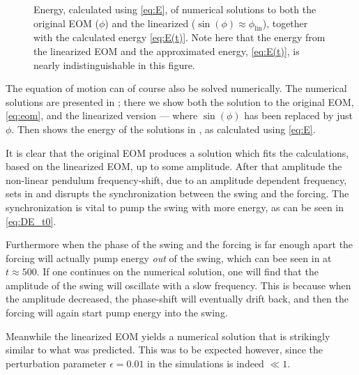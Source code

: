 \begin{figure}\centering
\caption{Energy, calculated using \eqref{eq:E}, of numerical solutions
  to both the original EOM ($\phi$) and the linearized
  ($\sin(\phi)\approx\phi_\text{lin}$), together with the calculated energy
  \eqref{eq:E(t)}. Note here that the energy from the linearized EOM
  and the approximated energy, \eqref{eq:E(t)}, is nearly
  indistinguishable in this figure.
}
\label{fig:sim_E}
\end{figure}

The equation of motion can of course also be solved numerically. The
numerical solutions are presented in ; there we show
both the solution to the original EOM, \eqref{eq:eom}, and the
linearized version --- where $\sin(\phi)$ has been replaced by just
$\phi$. Then  shows the energy of the solutions in
, as calculated using \eqref{eq:E}.

It is clear that the original EOM produces a solution which fits the
calculations, based on the linearized EOM, up to some amplitude. After
that amplitude the non-linear pendulum frequency-shift, due to an
amplitude dependent frequency, sets in and disrupts the
synchronization between the swing and the forcing. The synchronization is vital
to pump the swing with more energy, as can be seen in
\eqref{eq:DE_t0}. 

Furthermore when the phase of the swing and the
forcing is far enough apart the forcing will actually pump energy
\emph{out} of the swing, which can bee seen in  at
$t\approx500$. If one continues on the numerical solution, one will
find that the amplitude of the swing will oscillate with a slow
frequency. This is because when the amplitude decreased, the
phase-shift will eventually drift back, and then the forcing
will again start pump energy into the swing. 

Meanwhile the linearized EOM yields a numerical solution that is
strikingly similar to what was predicted. This was to be expected
however, since the perturbation parameter $\epsilon=0.01$ in the
simulations is indeed $\ll1$.










